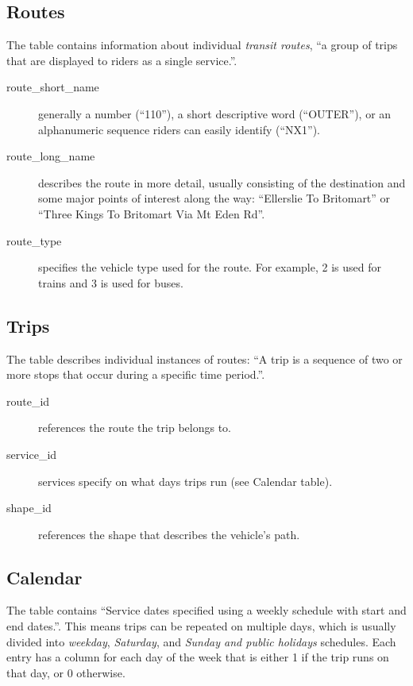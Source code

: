 \subsection*{Routes}
The  table contains information about individual \emph{transit routes}, ``a group of trips that are displayed to riders as a single service.''.
\begin{description}
  \item[route\_short\_name]
    generally a number (``110''), a short descriptive word (``OUTER''), or an alphanumeric sequence riders can easily identify (``NX1'').

  \item[route\_long\_name]
    describes the route in more detail, usually consisting of the destination and some major points of interest along the way: ``Ellerslie To Britomart'' or ``Three Kings To Britomart Via Mt Eden Rd''.

  \item[route\_type]
    specifies the vehicle type used for the route. For example, 2 is used for trains and 3 is used for buses.
\end{description}


\subsection*{Trips}
The  table describes individual instances of routes: ``A trip is a sequence of two or more stops that occur during a specific time period.''.
\begin{description}
  \item[route\_id] references the route the trip belongs to.
  \item[service\_id] services specify on what days trips run (see Calendar table).
  \item[shape\_id] references the shape that describes the vehicle's path.
\end{description}

\subsection*{Calendar}
The  table contains ``Service dates specified using a weekly schedule with start and end dates.''. This means trips can be repeated on multiple days, which is usually divided into \emph{weekday}, \emph{Saturday}, and \emph{Sunday and public holidays} schedules. Each entry has a column for each day of the week that is either 1 if the trip runs on that day, or 0 otherwise.

